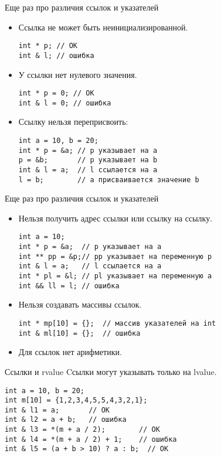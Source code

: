 \documentclass{beamer}
\begin{document}
\begin{frame}[fragile]{Еще раз про различия ссылок и указателей}
    \begin{itemize}
        \item Ссылка не может быть неинициализированной.
\begin{lstlisting}
int * p; // OK
int & l; // ошибка
\end{lstlisting}
        \item У ссылки нет нулевого значения.            
\begin{lstlisting}
int * p = 0; // OK
int & l = 0; // ошибка
\end{lstlisting}
    \item Ссылку нельзя переприсвоить:
\begin{lstlisting}
int a = 10, b = 20;
int * p = &a; // p указывает на a
p = &b;       // p указывает на b
int & l = a;  // l ссылается на a
l = b;        // a присваивается значение b
\end{lstlisting}
\end{itemize}
\end{frame}

\begin{frame}[fragile]{Еще раз про различия ссылок и указателей}
    \begin{itemize}
        \item Нельзя получить адрес ссылки или ссылку на ссылку.
\begin{lstlisting}
int a = 10;
int * p = &a;  // p указывает на a
int ** pp = &p;// pp указывает на переменную p
int & l = a;   // l ссылается на a
int * pl = &l; // pl указывает на переменную a
int && ll = l; // ошибка
\end{lstlisting}
        \item Нельзя создавать массивы ссылок.
\begin{lstlisting}
int * mp[10] = {};  // массив указателей на int
int & ml[10] = {};  // ошибка
\end{lstlisting}
        \item Для ссылок нет арифметики.
    \end{itemize}
\end{frame}

\begin{frame}[fragile]{Ссылки и rvalue}
    Cсылки могут указывать только на lvalue.
    \begin{lstlisting}
int a = 10, b = 20;
int m[10] = {1,2,3,4,5,5,4,3,2,1};
int & l1 = a;       // OK
int & l2 = a + b;   // ошибка
int & l3 = *(m + a / 2);        // OK
int & l4 = *(m + a / 2) + 1;    // ошибка
int & l5 = (a + b > 10) ? a : b;  // OK
    \end{lstlisting}
\end{frame}
\end{document}
